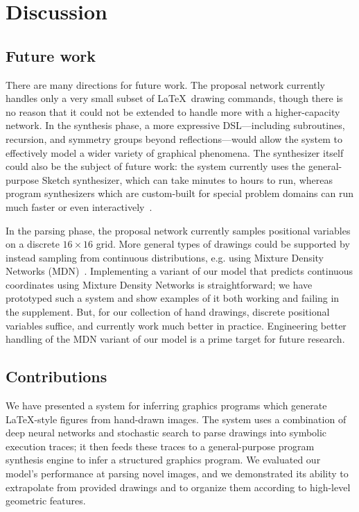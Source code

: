 \documentclass{article}
\begin{document}
\section{Discussion}

\subsection{Future work}
There are many directions for future work. The proposal network  currently handles only a very small subset of \LaTeX~drawing commands, though there is no reason that it could not be extended to handle more with a higher-capacity network.
In the synthesis phase, a more expressive DSL---including subroutines, recursion, and symmetry groups beyond reflections---would allow the system to effectively model a wider variety of graphical phenomena. The synthesizer itself could also be the subject of future work: the system currently uses the general-purpose Sketch synthesizer, which can take minutes to hours to run, whereas program synthesizers which are custom-built for special problem domains can run much faster or even interactively~\cite{le2014flashextract}.

In the parsing phase, the proposal network currently samples positional variables on a discrete $16\times 16$ grid. More general types of drawings could be supported by instead sampling from continuous distributions, e.g. using Mixture Density Networks (MDN)~\cite{MDN}.
Implementing a variant of our model that predicts continuous coordinates
using Mixture Density Networks is straightforward;
we have prototyped such a system and
show examples of it both working and failing in the supplement.
But, for our collection of hand drawings, discrete positional variables suffice,
and currently work much better in practice.
Engineering better handling of the MDN variant of our model is a prime target for future research.

\subsection{Contributions}

We have presented a system for inferring graphics programs which generate \LaTeX-style figures from hand-drawn images. The system uses a combination of deep neural networks and stochastic search to parse drawings into symbolic execution traces; it then feeds these traces to a general-purpose program synthesis engine to infer a structured graphics program. We evaluated our model's performance at parsing novel images, and we demonstrated its ability to extrapolate from provided drawings and to organize them according to high-level geometric features.
\end{document}
